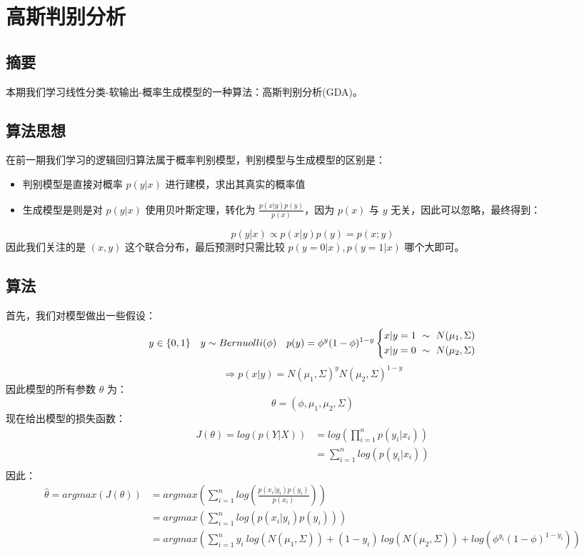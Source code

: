 \documentclass{report}
\begin{document}
\section{高斯判别分析}
\subsection{摘要}
本期我们学习线性分类-软输出-概率生成模型的一种算法：高斯判别分析(GDA)。
\subsection{算法思想}
在前一期我们学习的逻辑回归算法属于概率判别模型，判别模型与生成模型的区别是：
\begin{itemize}
	\item 判别模型是直接对概率 $p(y|x)$ 进行建模，求出其真实的概率值
	\item 生成模型是则是对 $p(y|x)$ 使用贝叶斯定理，转化为 $\frac{p(x|y)p(y)}{p(x)}$，因为 $p(x)$ 与 $y$ 无关，因此可以忽略，最终得到：
\end{itemize}
$$
p(y|x)\propto p(x|y)p(y)=p(x;y)
$$
因此我们关注的是 $(x,y)$ 这个联合分布，最后预测时只需比较 $p(y=0|x),p(y=1|x)$ 哪个大即可。
\subsection{算法}
首先，我们对模型做出一些假设：
$$
y\in \{0,1\}\quad y\sim Bernuolli(\phi)\quad p(y)=\phi^y(1-\phi)^{1-y}\\\left \{\begin{aligned}x|y=1 \ \sim \ N(\mu_1,\Sigma)\\x|y=0 \ \sim \ N(\mu_2,\Sigma)\end{aligned}\right.
$$
$$
\Longrightarrow p(x|y)=N(\mu_1,\Sigma)^yN(\mu_2,\Sigma)^{1-y}
$$
因此模型的所有参数 $\theta$ 为：
$$
\theta=(\phi, \mu_1, \mu_2, \Sigma)
$$
现在给出模型的损失函数：
$$
\begin{aligned}
J(\theta)=log(p(Y|X))&=log(\prod_{i=1}^n p(y_i|x_i))\\
&=\sum_{i=1}^n log(p(y_i|x_i))\\
\end{aligned}
$$
因此：
$$
\begin{aligned}
\hat{\theta}=argmax(J(\theta))&=argmax(\sum_{i=1}^nlog(\frac{p(x_i|y_i)p(y_i)}{p(x_i)}))\\
&=argmax(\sum_{i=1}^n log(p(x_i|y_i)p(y_i)))\\
&=argmax(\sum_{i=1}^n y_i\ log(N(\mu_1,\Sigma))+(1-y_i)\ log(N(\mu_2,\Sigma))+log(\phi^{y_i} (1-\phi)^{1-y_i}))
\end{aligned}
$$
\end{document}
